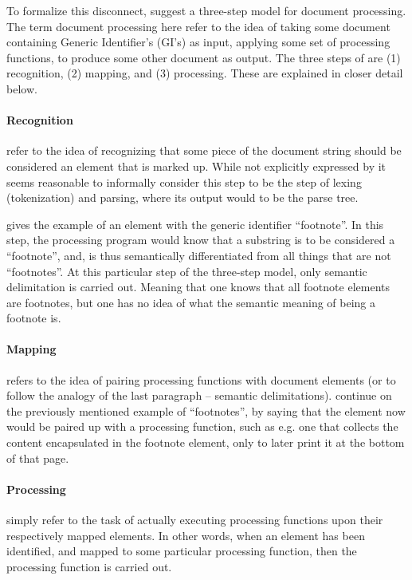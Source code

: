 \documentclass{scrreprt}
\begin{document}
To formalize this disconnect, \citet{goldfarb} suggest a three-step model for document processing. The term document processing here refer to the idea of taking some document containing Generic Identifier's (GI's) as input, applying some set of processing functions, to produce some other document as output. The three steps of \citet{goldfarb} are (1) recognition, (2) mapping, and (3) processing. These are explained in closer detail below.

\paragraph{Recognition} refer to the idea of recognizing that some piece of the document string should be considered an element that is marked up. While not explicitly expressed by \citet{goldfarb} it seems reasonable to informally consider this step to be the step of lexing (tokenization) and parsing, where its output would to be the parse tree.

\citet{goldfarb} gives the example of an element with the generic identifier ``footnote''. In this step, the processing program would know that a substring is to be considered a ``footnote'', and, is thus semantically differentiated from all things that are not ``footnotes''. At this particular step of the three-step model, only semantic delimitation is carried out. Meaning that one knows that all footnote elements are footnotes, but one has no idea of what the semantic meaning of being a footnote is.

\paragraph{Mapping} refers to the idea of pairing processing functions with document elements (or to follow the analogy of the last paragraph -- semantic delimitations). \citet{goldfarb} continue on the previously mentioned example of ``footnotes'', by saying that the element now would be paired up with a processing function, such as e.g. one that collects the content encapsulated in the footnote element, only to later print it at the bottom of that page.

\paragraph{Processing} simply refer to the task of actually executing processing functions upon their respectively mapped elements. In other words, when an element has been identified, and mapped to some particular processing function, then the processing function is carried out.
\end{document}
